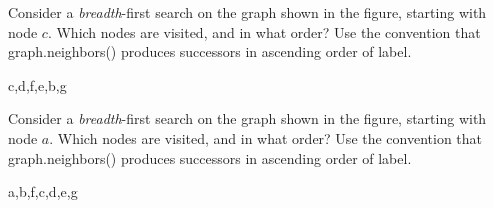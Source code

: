 \begin{prob}
    
    \begin{center}
	    \end{center}
    
    \begin{subprobset}
    
        \begin{subprob}
	    	Consider a \emph{breadth}-first search on the graph shown in
        	the figure, starting with node $c$.
        	Which nodes are visited, and in what order? Use the convention
            that graph.neighbors() produces successors in ascending
            order of label.
        \end{subprob}
        
        \begin{soln}
            c,d,f,e,b,g
        \end{soln}

        \vspace{1em}
        
        \begin{subprob}
	        Consider a \emph{breadth}-first search on the graph shown in
	        the figure, starting with node $a$.
            Which nodes are visited, and in what order? Use the convention
            that graph.neighbors() produces successors in ascending
            order of label.
        \end{subprob}
        
        \begin{soln}
            a,b,f,c,d,e,g
        \end{soln}


\end{subprobset}
\end{prob}
